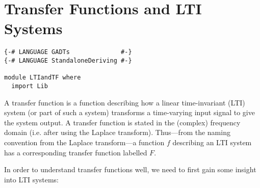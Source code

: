 \section{Transfer Functions and LTI Systems}\label{sec:tf}
\begin{verbatim}
{-# LANGUAGE GADTs              #-}
{-# LANGUAGE StandaloneDeriving #-}

module LTIandTF where
  import Lib
\end{verbatim}
\LNContinue
\noindent
A transfer function is a function describing how a linear time-invariant (LTI) system (or part of such a system) transforms a time-varying input signal to give the system output. \iffalse (more on LTI systems in a bit; \ref{sec:lti}). \fi 
 A transfer function is stated in the (complex) frequency domain (i.e. after using the Laplace transform). Thus---from the naming convention from the Laplace transform---a function $f$ describing an LTI system has a corresponding transfer function labelled $F$.

In order to understand transfer functions well, we need to first gain some insight into LTI systems:

